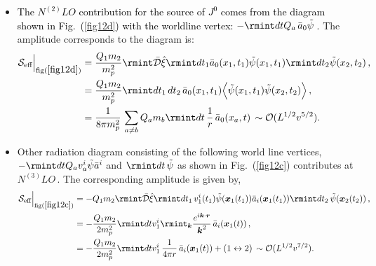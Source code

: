 \begin{itemize}
\begin{align}
    \begin{split}
          \mathcal{S}_{\text{eff}}\Big |_{\text{fig}(\ref{fig12b})}=\sum_{a}\rmint dt \, Q_a\,v_a^{i}\, \Bar{a}_{i}(\boldsymbol{x}_a(t))\,\sim\mathcal{O}(L^{1/2}v^{3/2}).
    \end{split}
\end{align}
\item \textcolor{black}{The $N^{(2)}LO$ contribution for the source of $J^{0}$ comes from the diagram shown in Fig.~(\ref{fig12d}) with the worldline vertex:
$-\rmint dt Q_a\,\Bar{a}_{0}\tilde{\psi}$\,.} The amplitude corresponds to the diagram is: 
\begin{align}
    \begin{split} \mathcal{S}_{\text{eff}}\Big |_{\text{fig}(\ref{fig12d})}&=\frac{Q_1m_2}{m_p^2}\rmint\Bar{\mathcal{D}}\Hat{\xi}\rmint dt_1 \Bar{a}_{0}(x_1,t_1)\tilde{\psi}(x_1,t_1)\rmint dt_2 \tilde{\psi}(x_2,t_2)\,,\\ &
        =\frac{Q_1m_2}{m_p^2}\rmint dt_1\,dt_2\,\Bar{a}_{0}(x_1,t_1)\Big\langle\tilde{\psi}(x_1,t_1)\tilde{\psi}(x_2,t_2)\Big\rangle\,, \\ &
        =\frac{1}{8\pi m_p^2}\,\sum_{a\ne b}Q_a m_b\rmint dt\, \frac{1}{r}\,\Bar{a}_{0}(x_a,t)\,\sim\mathcal{O}(L^{1/2}v^{5/2}).
    \end{split}
\end{align}
\item Other radiation diagram consisting of the following world line vertices, $-\rmint dt Q_a v_a^{i}\tilde{\psi}\Bar{a}^{i}$ and $\rmint dt \,\tilde{\psi}$ as shown in Fig.~(\ref{fig12c}) contributes at $N^{(3)}LO\,.$ The corresponding amplitude is given by,
\begin{align}
    \begin{split}
          \mathcal{S}_{\text{eff}}\Big |_{\text{fig}(\ref{fig12c})}&=-Q_1m_2\rmint\Bar{\mathcal{D}}\Hat{\xi}\rmint dt_1\, v_1^{i}(t_1)\tilde{\psi}(\boldsymbol{x}_1(t_1))\Bar{a}_{i}(\boldsymbol{x}_1(t_1))\rmint dt_2 \, \tilde{\psi}(\boldsymbol{x}_2(t_2))\,,\\ &
    =-\frac{Q_1m_2}{2m_p^2}\rmint dt v_1^{i}\rmint_{\boldsymbol{k}}\frac{e^{i\boldsymbol{k}\cdot\boldsymbol{r}}}{\boldsymbol{k}^2}\,\Bar{a}_{i}(\boldsymbol{x}_1(t))\,,\\ &
    =-\frac{Q_1m_2}{2m_p^2}\rmint dt v_1^{i}\, \frac{1}{4\pi r}\,\Bar{a}_{i}(\boldsymbol{x}_1(t))+(1\leftrightarrow 2)\,\sim\mathcal{O}(L^{1/2}v^{7/2}).
    \end{split}
\end{align}
\end{itemize}
